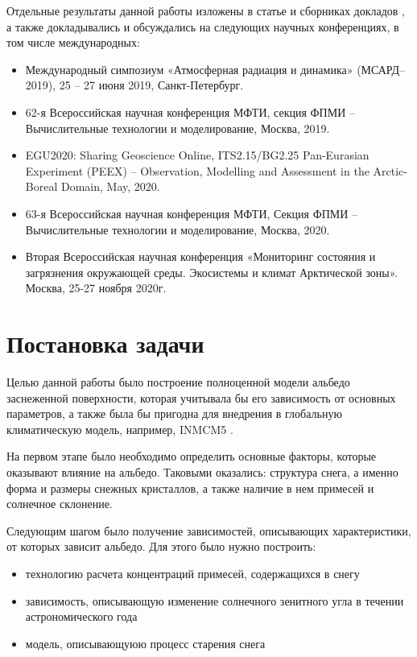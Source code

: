 \documentclass[a4paper, fontsize=14pt]{scrartcl}
\begin{document}
Отдельные результаты данной работы изложены в статье \cite{Chernenkov2021rus} и сборниках докладов  \cite{MSARD2019, mipt2019, EGU2020poster, EGU2020, mipt2020, Arctic2020}, а также докладывались и обсуждались на следующих научных конференциях, в том числе международных:
\begin{itemize}
    \item Международный симпозиум «Атмосферная радиация и динамика» (МСАРД–2019), 25 – 27 июня 2019, Санкт-Петербург. \cite{MSARD2019}
    \item 62-я Всероссийская научная конференция МФТИ, секция ФПМИ – Вычислительные технологии и моделирование, Москва, 2019. \cite{mipt2019}
    \item EGU2020: Sharing Geoscience Online, ITS2.15/BG2.25 Pan-Eurasian Experiment (PEEX) – Observation, Modelling and Assessment in the Arctic-Boreal Domain, May, 2020. \cite{EGU2020poster, EGU2020} \sloppy 
    \item 63-я Всероссийская научная конференция МФТИ, Секция ФПМИ – Вычислительные технологии и моделирование, Москва, 2020. \cite{mipt2020}
    \item Вторая Всероссийская научная конференция «Мониторинг состояния и загрязнения окружающей среды. Экосистемы и климат Арктической зоны». Москва, 25-27 ноября 2020г. \cite{Arctic2020}
\end{itemize} 



\newpage
\section{Постановка задачи}

Целью данной работы было построение полноценной модели альбедо заснеженной поверхности, которая учитывала бы его зависимость от основных параметров, а также была бы пригодна для внедрения в глобальную климатическую модель, например, INMCM5 \cite{Volodin2017}. 

На первом этапе было необходимо определить основные факторы, которые оказывают влияние на альбедо. Таковыми оказались: структура снега, а именно форма и размеры снежных кристаллов, а также наличие в нем примесей и солнечное склонение.

Следующим шагом было получение зависимостей, описывающих характеристики, от которых зависит альбедо. Для этого было нужно построить:
\begin{itemize}
    \item технологию расчета концентраций примесей, содержащихся в снегу
    \item зависимость, описывающую изменение солнечного зенитного угла в течении астрономического года
    \item модель, описывающуюю процесс старения снега 
\end{itemize} 
\end{document}
